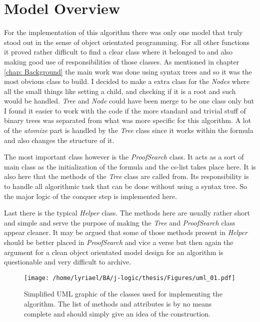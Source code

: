 
\section{Model Overview}
For the implementation of this algorithm there was only one model that truly stood out in the sense of object orientated programming. For all other functions it proved rather difficult to find a clear class where it belonged to and also making good use of responsibilities of those classes. As mentioned in chapter \ref{chap: Background} the main work was done using syntax trees and so it was the most obvious class to build. I decided to make a extra class for the \emph{Nodes} where all the small things like setting a child, and checking if it is a root and such would be handled. \emph{Tree} and \emph{Node} could have been merge to be one class only but I found it easier to work with the code if the more standard and trivial stuff of binary trees was separated from what was more specific for this algorithm. A lot of the \emph{atomize} part is handled by the \emph{Tree} class since it works within the formula and also changes the structure of it.

The most important class however is the \emph{ProofSearch} class. It acts as a sort of main class as the initialization of the formula and the cs-list takes place here. It is also here that the methods of the \emph{Tree} class are called from. Its responsibility is to handle all algorithmic task that can be done without using a syntax tree. So the major logic of the conquer step is implemented here.

Last there is the typical \emph{Helper} class. The methods here are usually rather short  and simple and serve the purpose of making the \emph{Tree} and \emph{ProofSearch} class appear cleaner. It may be argued that some of those methods present in \emph{Helper} should be better placed in \emph{ProofSearch} and vice a verse but then again the argument for a clean object orientated model design for an algorithm is questionable and very difficult to archive.

\begin{figure}[H]
	\texttt{[image: /home/lyriael/BA/j-logic/thesis/Figures/uml\_01.pdf]}
	\caption{Simplified UML graphic of the classes used for implementing the algorithm. The list of methods and attributes is by no means complete and should simply give an idea of the construction.}
	\label{uml}
\end{figure}


